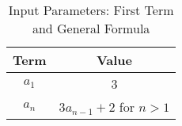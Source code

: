 \documentclass[12pt]{article}
\begin{document}
\begin{table}[h]
  \centering
  \caption{Input Parameters: First Term and General Formula}
  \begin{tabular}{|c|c|}
    \hline
    \textbf{Term} & \textbf{Value} \\
    \hline
    $a_1$ & 3 \\
    $a_n$ & $3a_{n-1} + 2$ for $n > 1$ \\
    \hline
  \end{tabular}
\end{table}
\end{document}
